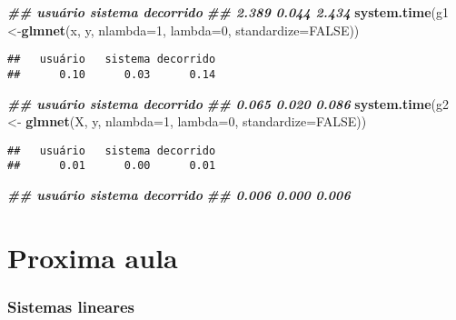 \documentclass[
]{article}
\newenvironment{Shaded}{\begin{snugshade}}{\end{snugshade}}
\newcommand{\AttributeTok}[1]{\textcolor[rgb]{0.13,0.29,0.53}{#1}}
\newcommand{\ConstantTok}[1]{\textcolor[rgb]{0.56,0.35,0.01}{#1}}
\newcommand{\DecValTok}[1]{\textcolor[rgb]{0.00,0.00,0.81}{#1}}
\newcommand{\DocumentationTok}[1]{\textcolor[rgb]{0.56,0.35,0.01}{\textbf{\textit{#1}}}}
\newcommand{\FunctionTok}[1]{\textcolor[rgb]{0.13,0.29,0.53}{\textbf{#1}}}
\newcommand{\NormalTok}[1]{#1}
\newcommand{\OtherTok}[1]{\textcolor[rgb]{0.56,0.35,0.01}{#1}}
\begin{document}
\begin{Shaded}
\begin{Highlighting}[]
\DocumentationTok{\#\# usuário sistema decorrido}
\DocumentationTok{\#\# 2.389 0.044 2.434}
\FunctionTok{system.time}\NormalTok{(g1 }\OtherTok{\textless{}{-}}\FunctionTok{glmnet}\NormalTok{(x, y, }\AttributeTok{nlambda=}\DecValTok{1}\NormalTok{, }\AttributeTok{lambda=}\DecValTok{0}\NormalTok{, }\AttributeTok{standardize=}\ConstantTok{FALSE}\NormalTok{))}
\end{Highlighting}
\end{Shaded}

\begin{verbatim}
##   usuário   sistema decorrido 
##      0.10      0.03      0.14
\end{verbatim}

\begin{Shaded}
\begin{Highlighting}[]
\DocumentationTok{\#\# usuário sistema decorrido}
\DocumentationTok{\#\# 0.065 0.020 0.086}
\FunctionTok{system.time}\NormalTok{(g2 }\OtherTok{\textless{}{-}} \FunctionTok{glmnet}\NormalTok{(X, y, }\AttributeTok{nlambda=}\DecValTok{1}\NormalTok{, }\AttributeTok{lambda=}\DecValTok{0}\NormalTok{, }\AttributeTok{standardize=}\ConstantTok{FALSE}\NormalTok{))}
\end{Highlighting}
\end{Shaded}

\begin{verbatim}
##   usuário   sistema decorrido 
##      0.01      0.00      0.01
\end{verbatim}

\begin{Shaded}
\begin{Highlighting}[]
\DocumentationTok{\#\# usuário sistema decorrido}
\DocumentationTok{\#\# 0.006 0.000 0.006}
\end{Highlighting}
\end{Shaded}

\hypertarget{proxima-aula}{%
\section{Proxima aula}\label{proxima-aula}}

\hypertarget{sistemas-lineares}{%
\subsubsection{Sistemas lineares}\label{sistemas-lineares}}
\end{document}
